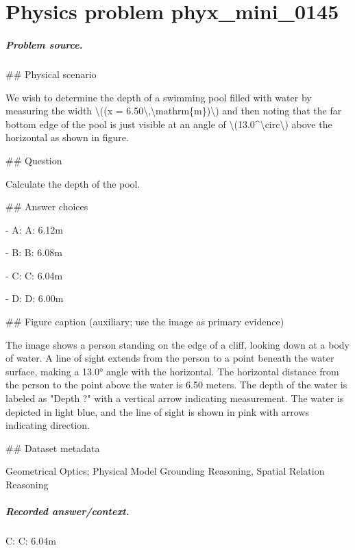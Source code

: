 
\chapter{Physics problem phyx\_mini\_0145}
\label{ch:PhyXMiniProblems_problem_phyx_mini_0145}

\paragraph{Problem source.}
\#\# Physical scenario

We wish to determine the depth of a swimming pool filled with water by measuring the width \textbackslash{}((x = 6.50\textbackslash{},\textbackslash{}mathrm\{m\})\textbackslash{}) and then noting that the far bottom edge of the pool is just visible at an angle of \textbackslash{}(13.0\textasciicircum{}\textbackslash{}circ\textbackslash{}) above the horizontal as shown in figure.

\#\# Question

Calculate the depth of the pool.

\#\# Answer choices

- A: A: 6.12m

- B: B: 6.08m

- C: C: 6.04m

- D: D: 6.00m

\#\# Figure caption (auxiliary; use the image as primary evidence)

The image shows a person standing on the edge of a cliff, looking down at a body of water. A line of sight extends from the person to a point beneath the water surface, making a 13.0° angle with the horizontal. The horizontal distance from the person to the point above the water is 6.50 meters. The depth of the water is labeled as "Depth ?" with a vertical arrow indicating measurement. The water is depicted in light blue, and the line of sight is shown in pink with arrows indicating direction.

\#\# Dataset metadata

Geometrical Optics; Physical Model Grounding Reasoning, Spatial Relation Reasoning

\paragraph{Recorded answer/context.}
C: C: 6.04m

